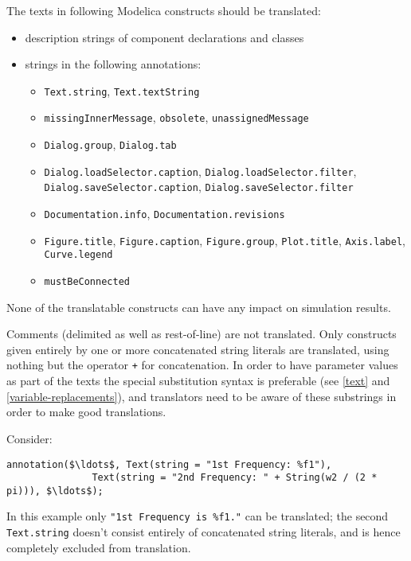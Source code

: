 The texts in following Modelica constructs should be translated:
\begin{itemize}
\item description strings of component declarations and classes
\item strings in the following annotations:
\begin{itemize}
\item \lstinline!Text.string!, \lstinline!Text.textString!
\item \lstinline!missingInnerMessage!, \lstinline!obsolete!, \lstinline!unassignedMessage!
\item \lstinline!Dialog.group!, \lstinline!Dialog.tab!
\item
  \lstinline!Dialog.loadSelector.caption!, \lstinline!Dialog.loadSelector.filter!,
  \ifpdf\\\else\fi%
  \lstinline!Dialog.saveSelector.caption!, \lstinline!Dialog.saveSelector.filter!
\item \lstinline!Documentation.info!, \lstinline!Documentation.revisions!
\item \lstinline!Figure.title!, \lstinline!Figure.caption!, \lstinline!Figure.group!, \lstinline!Plot.title!, \lstinline!Axis.label!, \lstinline!Curve.legend!
\item \lstinline!mustBeConnected!
\end{itemize}
\end{itemize}

\begin{nonnormative}
None of the translatable constructs can have any impact on simulation results.
\end{nonnormative}

Comments (delimited as well as rest-of-line) are not translated.
Only constructs given entirely by one or more concatenated string literals are translated, using nothing but the operator \lstinline!+! for concatenation.
In order to have parameter values as part of the texts the special substitution syntax is preferable (see \cref{text} and \cref{variable-replacements}), and translators need to be aware of these substrings in order to make good translations.

\begin{example}
Consider:
\begin{lstlisting}[language=modelica]
annotation($\ldots$, Text(string = "1st Frequency: %f1"),
               Text(string = "2nd Frequency: " + String(w2 / (2 * pi))), $\ldots$);
\end{lstlisting}
In this example only \lstinline!"1st Frequency is %f1."! can be translated; the second \lstinline!Text.string! doesn't consist entirely of concatenated string literals, and is hence completely excluded from translation.
\end{example}

